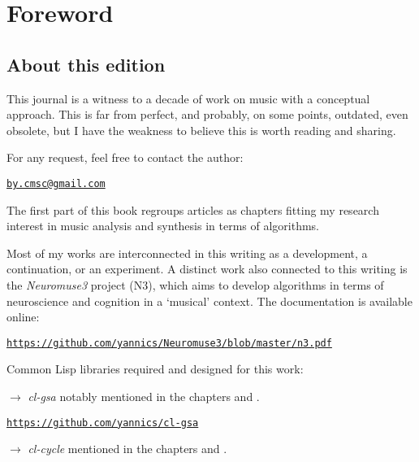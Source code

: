 \frontmatter
\def\thepage{\arabic{page}}
\setcounter{page}{3}

\chapter*{Foreword}
\thispagestyle{empty}

\section*{About this edition}
\label{ate}

\bigskip
This journal is a witness to a decade of work on music with a conceptual approach.
This is far from perfect, and probably, on some points, outdated, even obsolete, but I have the weakness to believe this is worth reading and sharing.

\bigskip
\bigskip

For any request, feel free to contact the author: 

\smallskip

\quad \quad \href{mailto:jby.cmsc@gmail.com}{\texttt{by.cmsc@gmail.com}}

\bigskip
\bigskip

The first part of this book regroups articles as chapters fitting my research interest in music analysis and synthesis in terms of algorithms. 
\smallskip

Most of my works are interconnected in this writing as a development, a continuation, or an experiment. A distinct work also connected to this writing  
 is the \textsl{Neuromuse3} project (N3), which aims to develop algorithms in terms of neuroscience and cognition in a `musical' context. The documentation is available online:

\href{https://github.com/yannics/Neuromuse3/blob/master/n3.pdf}{\texttt{\small https://github.com/yannics/Neuromuse3/blob/master/n3.pdf}}

\bigskip
\bigskip
Common Lisp libraries required and designed for this work:

\smallskip

\noindent $\rightarrow$ \textsl{cl-gsa} notably mentioned in the chapters \textsl{} and \textsl{}.

\href{https://github.com/yannics/cl-gsa}{\texttt{\small https://github.com/yannics/cl-gsa}}

\smallskip

\noindent $\rightarrow$ \textsl{cl-cycle} mentioned in the chapters \textsl{} and  \textsl{}. 

